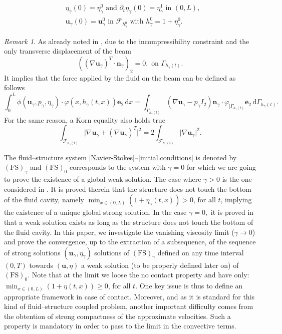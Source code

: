 \documentclass[10pt]{amsart}
\let\mathcal\mathscr
\newcommand{\FS}{\mathrm{FS}}
\theoremstyle{remark}
\newtheorem{remark}[theorem]{Remark}
\theoremstyle{definition}
\newcommand{\ug}{\boldsymbol{u}}
\newcommand{\dd}{\,\mathrm{d}}
\newcommand{\normal}{\BS{n}}
\newcommand{\BS}[1]{\boldsymbol{#1}}
\begin{document}
\begin{equation}\label{initial.conditions}
\begin{aligned}
&\eta_{\gamma}(0)=\eta^{0}_\gamma\text{ and }\partial_{t}\eta_{\gamma}(0)=\eta_\gamma^{1}\text{ in }(0,L),\\
&\ug_{\gamma}(0)=\ug_\gamma^{0}\text{ in }\mathcal{F}_{h_\gamma^{0}}\text{ with }h_\gamma^{0}=1+\eta_\gamma^{0}.
\end{aligned}
\end{equation}
\begin{remark}\label{rem:korn}
As already noted in \cite{Chambolle-etal}, due to the incompressibility constraint and the only transverse displacement of the beam
\[
\left((\nabla \ug_\gamma)^T\cdot\normal_\gamma\right)_2=0, \text{ on }\Gamma_{h_{\gamma}(t)}.
\]
It implies that the force applied by the fluid on the beam can be defined as follows
\[
\int_{0}^{L}\phi(\ug_{\gamma},p_{\gamma},\eta_{\gamma})\cdot \varphi(x,h_{\gamma}(t,x))\BS{e}_{2}\dd x=\int_{\Gamma_{h_{\gamma}(t)}}(\nabla\ug_{\gamma}-p_{\gamma}I_2)\normal_{\gamma}\cdot \varphi_{\vert\Gamma_{h_{\gamma}(t)}}\BS{e}_{2}\dd\Gamma_{h_{\gamma}(t)}.
\]
For the same reason, a Korn equality also holds true
\[
\int_{\mathcal{F}_{h_\gamma(t)}} \vert\nabla\ug_{\gamma} +( \nabla\ug_{\gamma})^{T}\vert^2 =2\int_{\mathcal{F}_{h_\gamma(t)}} \vert\nabla\ug_{\gamma} \vert^2.
\]
\end{remark}

The fluid--structure system \eqref{Navier-Stokes}--\eqref{initial.conditions} is denoted by $(\FS)_{\gamma}$ and $(\FS)_0$ corresponds to the system with $\gamma=0$ for which we are going to prove the existence of a global weak solution.
The case where $\gamma>0$ is the one considered in \cite{Grandmont-Hillairet}. It is proved therein that the structure does not touch the bottom of the fluid cavity, namely $\min_{x\in (0, L)}(1+\eta_\gamma(t, x)) >0$, for all $t$, implying the existence of a unique global strong solution. In the case $\gamma=0,$ it is proved in \cite{Grandmont08, Muha-Canic13} that a weak solution exists as long as the structure does not touch the bottom of the fluid cavity. In this paper, we investigate the vanishing viscosity limit (\ie $\gamma\to 0$) and prove the convergence, up to the extraction of a subsequence, of the sequence of strong solutions $(\ug_\gamma,\eta_\gamma)$ solutions of $(\FS)_{\gamma}$ defined on any time interval $(0, T)$ towards $(\ug, \eta)$ a weak solution (to be properly defined later on) of $(\FS)_0$. Note that at the limit we loose the no contact property and have only: $\min_{x\in (0, L)}(1+\eta(t, x))\geq 0$, for all $t$. One key issue is thus to define an appropriate framework in case of contact. Moreover, and as it is standard for this kind of fluid--structure coupled problem, another important difficulty comes from the obtention of strong compactness of the approximate velocities. Such a property is mandatory in order to pass to the limit in the convective terms.
 
\end{document}
